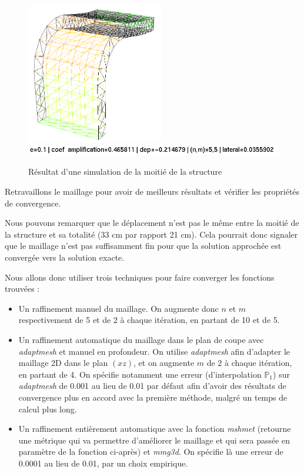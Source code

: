     \begin{figure}        
        \begin{center}
        
            \includegraphics[width=6cm]{imgs/half_simu.PNG}
            \includegraphics[width=12cm ]{imgs/half_simu_label.PNG}
            \caption{Résultat d'une simulation de la moitié de la structure}
            \label{fig:simu_def_moitie}
        
        \end{center}
    \end{figure}


\begin{problem}{4}
    Retravaillons le maillage pour avoir de meilleurs résultats et vérifier les propriétés de convergence.
\end{problem}

    Nous pouvons remarquer que le déplacement n'est pas le même entre la moitié de la structure et sa totalité (33 cm par rapport 21 cm).
    Cela pourrait donc signaler que le maillage n'est pas suffisamment fin pour que la solution approchée est convergée vers la solution exacte.

    Nous allons donc utiliser trois techniques pour faire converger les fonctions trouvées :
    \begin{itemize}
        \item Un raffinement manuel du maillage. On augmente donc $n$ et $m$ respectivement de 5 et de 2 à chaque itération, en partant de 10 et de 5.
        \item Un raffinement automatique du maillage dans le plan de coupe avec \emph{adaptmesh} et manuel en profondeur. On utilise \emph{adaptmesh} afin d'adapter le maillage 2D
        dans le plan $(xz)$,
                et on augmente $m$ de 2 à chaque itération, en partant de 4. On spécifie 
                notamment une erreur (d'interpolation $\mathbb{P}_1$) sur \emph{adaptmesh} de 0.001 au lieu de 0.01 par défaut afin d'avoir des 
                résultats de convergence plus en accord avec la première méthode, malgré un temps de calcul plus long.
        \item Un raffinement entièrement automatique avec la fonction \emph{mshmet} (retourne une métrique qui va permettre
        d'améliorer le maillage et qui sera passée en paramètre de la fonction ci-après) et \emph{mmg3d}.
            On spécifie là une erreur de 0.0001 au lieu de 0.01, par un choix empirique.
    \end{itemize}
    
